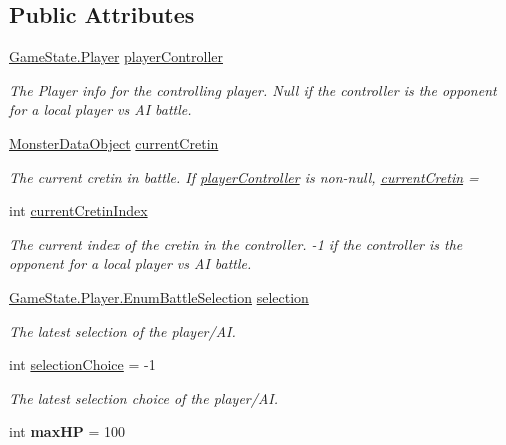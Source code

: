 \subsection*{Public Attributes}
\begin{DoxyCompactItemize}
\item 
\hyperlink{class_game_state_1_1_player}{Game\-State.\-Player} \hyperlink{class_battle_participant_a2f1584b2283c99eaaaa8e5b66ced968f}{player\-Controller}
\begin{DoxyCompactList}\small\item\em The Player info for the controlling player. Null if the controller is the opponent for a local player vs A\-I battle. \end{DoxyCompactList}\item 
\hyperlink{class_monster_data_object}{Monster\-Data\-Object} \hyperlink{class_battle_participant_a595abdc8d0d62918b99b37ea9d948d00}{current\-Cretin}
\begin{DoxyCompactList}\small\item\em The current cretin in battle. If \hyperlink{class_battle_participant_a2f1584b2283c99eaaaa8e5b66ced968f}{player\-Controller} is non-\/null, \hyperlink{class_battle_participant_a595abdc8d0d62918b99b37ea9d948d00}{current\-Cretin} = \end{DoxyCompactList}\item 
int \hyperlink{class_battle_participant_a1ad2e6be9469ff3c433be70fc6245484}{current\-Cretin\-Index}
\begin{DoxyCompactList}\small\item\em The current index of the cretin in the controller. -\/1 if the controller is the opponent for a local player vs A\-I battle. \end{DoxyCompactList}\item 
\hyperlink{class_game_state_1_1_player_a9f54c5eca1e60acbaa2074e981f51615}{Game\-State.\-Player.\-Enum\-Battle\-Selection} \hyperlink{class_battle_participant_abf036cb064ddcd97270c1b9ed8442f50}{selection}
\begin{DoxyCompactList}\small\item\em The latest selection of the player/\-A\-I. \end{DoxyCompactList}\item 
int \hyperlink{class_battle_participant_a30032b373a898bbb16f67e24bf245557}{selection\-Choice} = -\/1
\begin{DoxyCompactList}\small\item\em The latest selection choice of the player/\-A\-I. \end{DoxyCompactList}\item 
\hypertarget{class_battle_participant_aaaf39966d5d8017188b88d28e6e129d7}{int {\bfseries max\-H\-P} = 100}\label{class_battle_participant_aaaf39966d5d8017188b88d28e6e129d7}

\end{DoxyCompactItemize}
